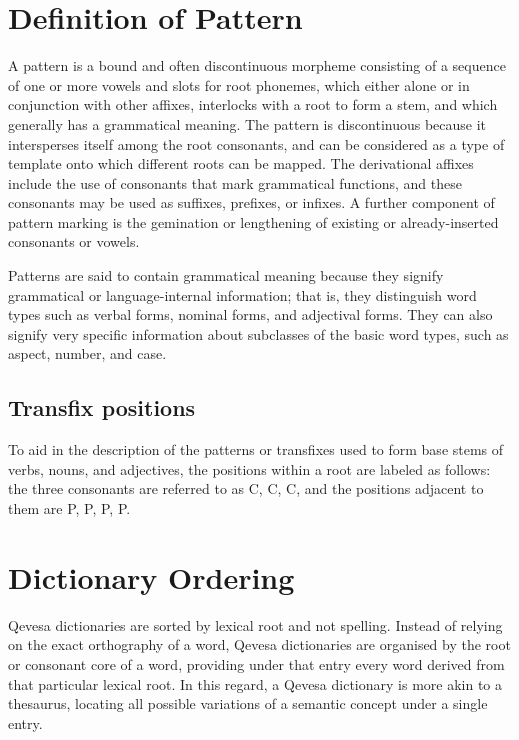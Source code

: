 \documentclass[grammar]{subfiles}
\begin{document}
  \section{Definition of Pattern}
  \label{sec:mt_definition_of_pattern}

  A pattern is a bound and often discontinuous morpheme consisting of a sequence of one or more vowels and slots for root phonemes, which either alone or in conjunction with other affixes, interlocks with a root to form a stem, and which generally has a grammatical meaning. The pattern is discontinuous because it intersperses itself among the root consonants, and can be considered as a type of template onto which different roots can be mapped. The derivational affixes include the use of consonants that mark grammatical functions, and	these consonants may be used as suffixes, prefixes, or infixes. A further component of pattern marking is the gemination or lengthening of existing or already-inserted consonants or vowels.

  Patterns are said to contain grammatical meaning because they signify grammatical or language-internal information; that is, they distinguish word types such as verbal forms, nominal forms, and adjectival forms. They can also signify very specific information about subclasses of the basic word types, such as aspect, number, and case.

  \subsection{Transfix positions}
  \label{ssec:mt_transfix_positions}

  To aid in the description of the patterns or transfixes used to form base stems of verbs, nouns, and adjectives, the positions within a root are labeled as follows: the three consonants are referred to as C, C, C, and the positions adjacent to them are P, P, P, P.

  \section{Dictionary Ordering}
  \label{sec:mt_dictionary_ordering}

  Qevesa dictionaries are sorted by lexical root and not spelling. Instead of relying on the exact orthography of a word, Qevesa dictionaries are organised by the root or consonant core of a word, providing under that entry every word derived from that particular lexical root. In this regard, a Qevesa dictionary is more akin to a thesaurus, locating all possible variations of a semantic concept under a single entry.
\end{document}
